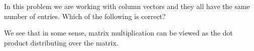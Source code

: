 \documentclass{ximera}
\author{Bart Snapp}
\begin{document}
\begin{exercise}
  In this problem we are working with column vectors and they all have
  the same number of entries. Which of the following is correct?
  \begin{multipleChoice}
  \end{multipleChoice}
  \begin{feedback}[correct]
    We see that in some sense, matrix multiplication can be viewed as
    the dot product distributing over the matrix.
  \end{feedback}
\end{exercise}
\end{document}
